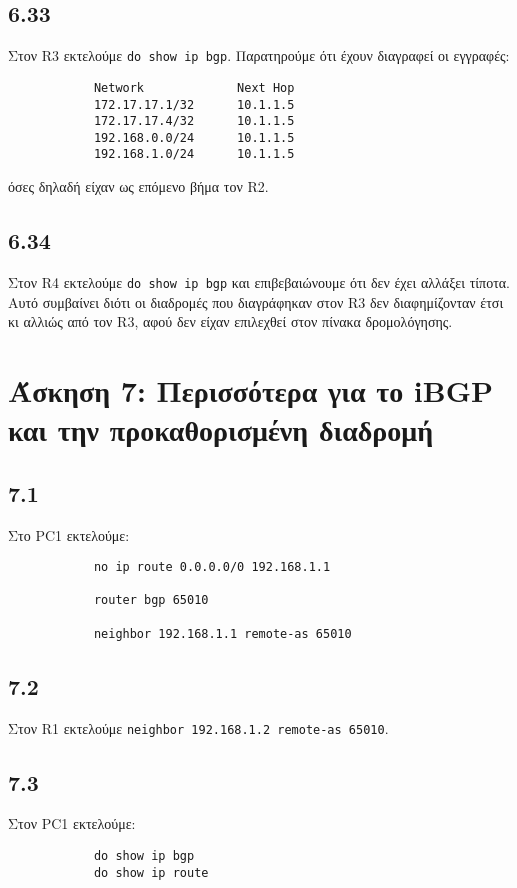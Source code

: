 \documentclass[a4paper, 12pt]{article}
\begin{document}
	\subsection*{6.33}
		Στον R3 εκτελούμε \verb|do show ip bgp|. Παρατηρούμε ότι έχουν διαγραφεί οι εγγραφές:
		
		\begin{verbatim}
			Network             Next Hop 
			172.17.17.1/32      10.1.1.5
			172.17.17.4/32      10.1.1.5
			192.168.0.0/24      10.1.1.5
			192.168.1.0/24      10.1.1.5
		\end{verbatim}
		
		όσες δηλαδή είχαν ως επόμενο βήμα τον R2.

	\subsection*{6.34}
		Στον R4 εκτελούμε \verb|do show ip bgp| και επιβεβαιώνουμε ότι δεν έχει αλλάξει τίποτα. Αυτό συμβαίνει διότι οι διαδρομές που διαγράφηκαν στον R3 δεν διαφημίζονταν έτσι κι αλλιώς από τον R3, αφού δεν είχαν επιλεχθεί στον πίνακα δρομολόγησης. 

\section*{Άσκηση 7: Περισσότερα για το iBGP και την προκαθορισμένη διαδρομή}

	\subsection*{7.1}
		Στο PC1 εκτελούμε:
		
		\begin{verbatim}
			no ip route 0.0.0.0/0 192.168.1.1
			
			router bgp 65010
			
			neighbor 192.168.1.1 remote-as 65010
		\end{verbatim}

	\subsection*{7.2}
		Στον R1 εκτελούμε \verb|neighbor 192.168.1.2 remote-as 65010|.

	\subsection*{7.3}
		Στον PC1 εκτελούμε:
		
		\begin{verbatim}
			do show ip bgp
			do show ip route
		\end{verbatim} 
		
\end{document}
